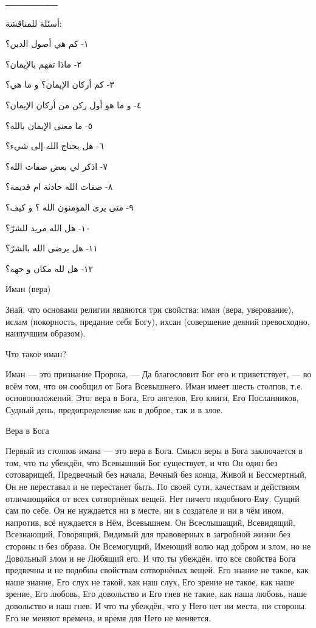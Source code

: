 \documentclass[a5paper]{article}
\begin{document}
ـــــــــــــــــــــ

أسئلة للمناقشة:

١- كم هي أصول الدين؟

٢- ماذا تفهم بالإيمان؟

٣- كم أركان الإيمان؟ و ما هي؟ 

٤- و ما هو أول ركن من أركان الإيمان؟

٥- ما معنى الإيمان بالله؟

٦- هل يحتاج الله إلى شيء؟

٧- اذكر لي بعض صفات الله؟

٨- صفات الله حادثة ام قديمة؟ 

٩- متى يرى المؤمنون الله ؟ و كيف؟

١٠- هل الله مريد للشرّ؟

١١- هل يرضى الله بالشرّ؟

١٢- هل لله مكان و جهة؟

Иман (вера)

Знай, что основами религии являются три свойства: иман (вера, уверование), ислам (покорность, предание себя Богу), ихсан (совершение деяний превосходно, наилучшим образом).

Что такое иман?

Иман — это признание Пророка, — Да благословит Бог его и приветствует, — во всём том, что он сообщил от Бога Всевышнего. Иман имеет шесть столпов, т.е. основоположений. Это: вера в Бога, Его ангелов, Его книги, Его Посланников, Судный день, предопреде­ление как в доброе, так и в злое.

Вера в Бога

Первый из столпов имана — это вера в Бога. Смысл веры в Бога заключается в том, что ты убеждён, что Всевышний Бог существует, и что Он один без сотоварищей, Предвечный без начала, Вечный без конца, Живой и Бессмертный, Он не переставал и не перестанет быть. По своей сути, качествам и действиям отличающийся от всех сотворнёных вещей. Нет ничего подобного Ему. Сущий сам по себе. Он не нуждается ни в месте, ни в создателе и ни в чём ином, напротив, всё нуждается в Нём, Всевышнем. Он Всеслышащий, Всевидящий, Всезнающий, Говорящий, Видимый для правоверных в загробной жизни без стороны и без образа. Он Всемогущий, Имеющий волю над добром и злом, но не Довольный злом и не Любящий его. И что ты убеждён, что все свойства Бога предвечны и не подобны свойствам сотворнёных вещей. Его знание не такое, как наше знание, Его слух не такой, как наш слух, Его зрение не такое, как наше зрение, Его любовь, Его довольство и Его гнев не такие, как наша любовь, наше довольство и наш гнев. И что ты убеждён, что у Него нет ни места, ни стороны. Его не меняют времена, и время для Него не меняется.
\end{document}
